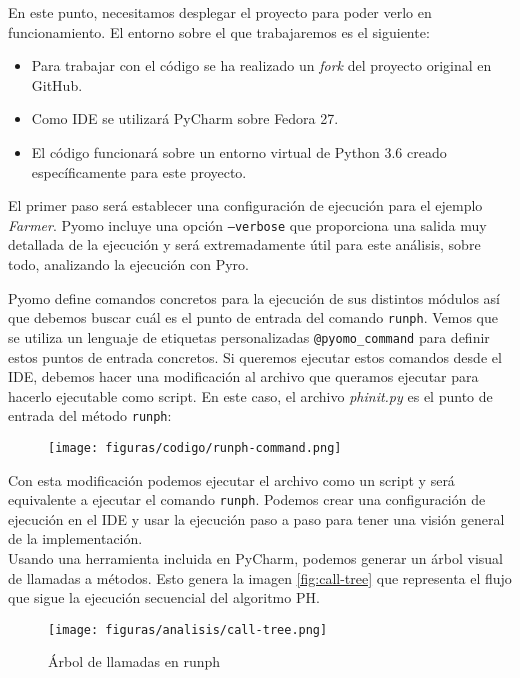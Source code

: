 En este punto, necesitamos desplegar el proyecto para poder verlo en funcionamiento. El entorno sobre el que trabajaremos es el siguiente:

\begin{itemize}
    \item Para trabajar con el código se ha realizado un \textit{fork} del proyecto original en GitHub.
    \item Como IDE se utilizará PyCharm sobre Fedora 27.
    \item El código funcionará sobre un entorno virtual de Python 3.6 creado específicamente para este proyecto.
\end{itemize}

El primer paso será establecer una configuración de ejecución para el ejemplo \textit{Farmer}. Pyomo incluye una opción \texttt{--verbose} que proporciona una salida muy detallada de la ejecución y será extremadamente útil para este análisis, sobre todo, analizando la ejecución con Pyro.

Pyomo define comandos concretos para la ejecución de sus distintos módulos así que debemos buscar cuál es el punto de entrada del comando \texttt{runph}. Vemos que se utiliza un lenguaje de etiquetas personalizadas \texttt{@pyomo\_command} para definir estos puntos de entrada concretos. Si queremos ejecutar estos comandos desde el IDE, debemos hacer una modificación al archivo que queramos ejecutar para hacerlo ejecutable como script. En este caso, el archivo \textit{phinit.py} es el punto de entrada del método \texttt{runph}:

\begin{figure}[H]
    \centerline{\texttt{[image: figuras/codigo/runph-command.png]}}
\end{figure}

Con esta modificación podemos ejecutar el archivo como un script y será equivalente a ejecutar el comando \texttt{runph}. Podemos crear una configuración de ejecución en el IDE y usar la ejecución paso a paso para tener una visión general de la implementación. \\

Usando una herramienta incluida en PyCharm, podemos generar un árbol visual de llamadas a métodos. Esto genera la imagen \autoref{fig:call-tree} que representa el flujo que sigue la ejecución secuencial del algoritmo PH.

\begin{figure}[]
    \centerline{\texttt{[image: figuras/analisis/call-tree.png]}}
    \caption{Árbol de llamadas en runph}
    \label{fig:call-tree}
\end{figure}

